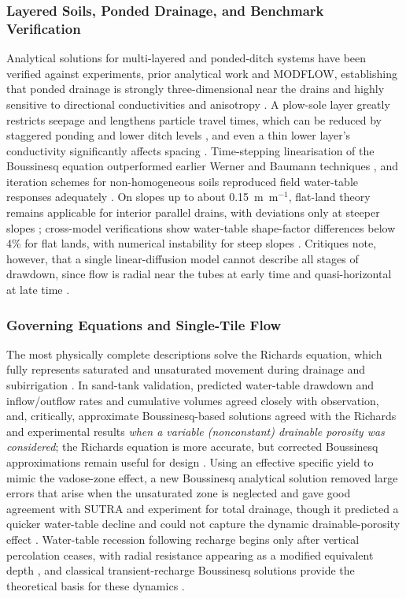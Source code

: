 \documentclass[11pt]{article}
\begin{document}
\subsubsection{Layered Soils, Ponded Drainage, and Benchmark Verification}

Analytical solutions for multi-layered and ponded-ditch systems have been verified against experiments, prior analytical work and MODFLOW, establishing that ponded drainage is strongly three-dimensional near the drains and highly sensitive to directional conductivities and anisotropy \parencite{Chakrabarti2020,Sarmah2015,SHARMA1991,Afruzi2014}. A plow-sole layer greatly restricts seepage and lengthens particle travel times, which can be reduced by staggered ponding and lower ditch levels \parencite{Chakrabarti2020,Sarmah2015}, and even a thin lower layer's conductivity significantly affects spacing \parencite{SHARMA1991}. Time-stepping linearisation of the Boussinesq equation outperformed earlier Werner and Baumann techniques \parencite{Lin2025}, and iteration schemes for non-homogeneous soils reproduced field water-table responses adequately \parencite{CHU1977}. On slopes up to about 0.15~m~m$^{-1}$, flat-land theory remains applicable for interior parallel drains, with deviations only at steeper slopes \parencite{FIPPS1989}; cross-model verifications show water-table shape-factor differences below 4\% for flat lands, with numerical instability for steep slopes \parencite{LORRE1994,Nédélec2010}. Critiques note, however, that a single linear-diffusion model cannot describe all stages of drawdown, since flow is radial near the tubes at early time and quasi-horizontal at late time \parencite{Kacimov2000}.

\subsubsection{Governing Equations and Single-Tile Flow}

The most physically complete descriptions solve the Richards equation, which fully represents saturated and unsaturated movement during drainage and subirrigation \parencite{TANG1977}. In sand-tank validation, predicted water-table drawdown and inflow/outflow rates and cumulative volumes agreed closely with observation, and, critically, approximate Boussinesq-based solutions agreed with the Richards and experimental results \emph{when a variable (nonconstant) drainable porosity was considered}; the Richards equation is more accurate, but corrected Boussinesq approximations remain useful for design \parencite{TANG1977}. Using an effective specific yield to mimic the vadose-zone effect, a new Boussinesq analytical solution removed large errors that arise when the unsaturated zone is neglected and gave good agreement with SUTRA and experiment for total drainage, though it predicted a quicker water-table decline and could not capture the dynamic drainable-porosity effect \parencite{Xin2016c}. Water-table recession following recharge begins only after vertical percolation ceases, with radial resistance appearing as a modified equivalent depth \parencite{VANDELEUR1959}, and classical transient-recharge Boussinesq solutions provide the theoretical basis for these dynamics \parencite{SINGH1980,Bouarfa2000}.
\end{document}
